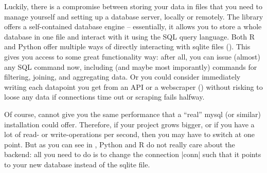 Luckily, there is a compromise between storing your data in files
that you need to manage yourself and setting up a database server,
locally or remotely. The library  offers a self-contained
database engine -- essentially, it allows you to store a whole
database in one file and interact with it using the SQL query language.
Both R and Python offer multiple ways of directly interacting with
sqlite files (). This gives you access to some great
functionality way: after all, you can issue (almost) any SQL command
now, including (and maybe most imporantly) commands for filtering,
joining, and aggregating data. Or you could consider immediately writing
each datapoint you get from an API or a webscraper ()
without risking to loose any data if connections time out or scraping
fails halfway.


Of course,  cannot give you the same performance that a ``real'' mysql (or similar) installation could offer. Therefore, if your project grows bigger, or if you have a lot of read- or
write-operations per second, then you may have to switch at one
point. But as you can see in , Python and R do not
really care about the backend: all you need to do is to change the
connection |conn| such that it points to your new database instead of
the sqlite file.


